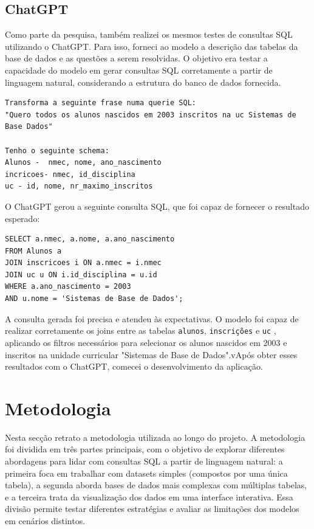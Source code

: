 \documentclass{article}
\begin{document}
\subsection{ChatGPT \cite{chatgpt2025}}

\hspace*{1em} Como parte da pesquisa, também realizei os mesmos testes de consultas SQL utilizando o ChatGPT. Para isso, forneci ao modelo a descrição das tabelas da base de dados e as questões a serem resolvidas. O objetivo era testar a capacidade do modelo em gerar consultas SQL corretamente a partir de linguagem natural, considerando a estrutura do banco de dados fornecida.

\begin{lstlisting} 
Transforma a seguinte frase numa querie SQL:
"Quero todos os alunos nascidos em 2003 inscritos na uc Sistemas de Base Dados"

Tenho o seguinte schema:
Alunos -  nmec, nome, ano_nascimento
incricoes- nmec, id_disciplina
uc - id, nome, nr_maximo_inscritos
\end{lstlisting}

O ChatGPT gerou a seguinte consulta SQL, que foi capaz de fornecer o resultado esperado:

\begin{lstlisting} 
SELECT a.nmec, a.nome, a.ano_nascimento 
FROM Alunos a 
JOIN inscricoes i ON a.nmec = i.nmec 
JOIN uc u ON i.id_disciplina = u.id 
WHERE a.ano_nascimento = 2003 
AND u.nome = 'Sistemas de Base de Dados'; 
\end{lstlisting}

A consulta gerada foi precisa e atendeu às expectativas. O modelo foi capaz de realizar corretamente os joins entre as tabelas \texttt{alunos}, \texttt{inscrições} e \texttt{uc} , aplicando os filtros necessários para selecionar os alunos nascidos em 2003 e inscritos na unidade curricular "Sistemas de Base de Dados".vApós obter esses resultados com o ChatGPT, comecei o desenvolvimento da aplicação.

\section{Metodologia}

\hspace*{1em} Nesta secção retrato a metodologia utilizada ao longo do projeto. A metodologia foi dividida em três partes principais, com o objetivo de explorar diferentes abordagens para lidar com consultas SQL a partir de linguagem natural: a primeira foca em trabalhar com datasets simples (compostos por uma única tabela), a segunda aborda bases de dados mais complexas com múltiplas tabelas, e a terceira trata da visualização dos dados em uma interface interativa. Essa divisão permite testar diferentes estratégias e avaliar as limitações dos modelos em cenários distintos.
\end{document}
